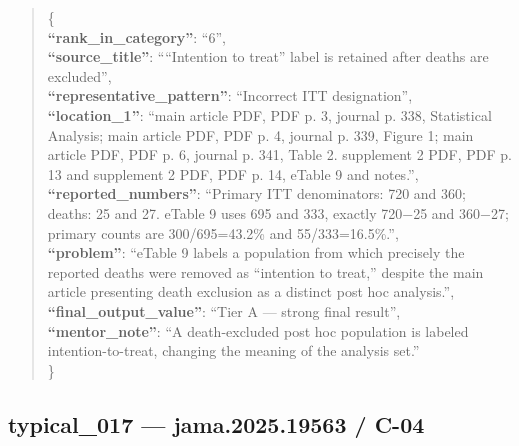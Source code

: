 \documentclass[
  letterpaper,
  9pt]{extreport}
\begin{document}
\begin{quote}
\{\\
\textbf{``rank\_in\_category''}: ``6'',\\
\textbf{``source\_title''}: ````Intention to treat'' label is retained
after deaths are excluded'',\\
\textbf{``representative\_pattern''}: ``Incorrect ITT designation'',\\
\textbf{``location\_1''}: ``main article PDF, PDF p. 3, journal p. 338,
Statistical Analysis; main article PDF, PDF p. 4, journal p. 339, Figure
1; main article PDF, PDF p. 6, journal p. 341, Table 2. supplement 2
PDF, PDF p. 13 and supplement 2 PDF, PDF p. 14, eTable 9 and notes.'',\\
\textbf{``reported\_numbers''}: ``Primary ITT denominators: 720 and 360;
deaths: 25 and 27. eTable 9 uses 695 and 333, exactly 720−25 and 360−27;
primary counts are 300/695=43.2\% and 55/333=16.5\%.'',\\
\textbf{``problem''}: ``eTable 9 labels a population from which
precisely the reported deaths were removed as ``intention to treat,''
despite the main article presenting death exclusion as a distinct post
hoc analysis.'',\\
\textbf{``final\_output\_value''}: ``Tier A --- strong final result'',\\
\textbf{``mentor\_note''}: ``A death-excluded post hoc population is
labeled intention-to-treat, changing the meaning of the analysis
set.''\\
\}
\end{quote}

\hypertarget{typical_017--jama202519563--c-04}{%
\subsection{typical\_017 --- jama.2025.19563 /
C-04}\label{typical_017--jama202519563--c-04}}
\end{document}

